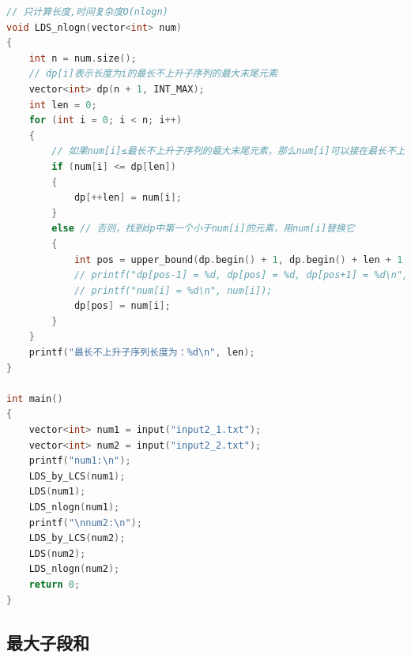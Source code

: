 \documentclass[lang=cn,11pt,a4paper]{elegantpaper}
\begin{document}
\begin{lstlisting}[language=c++]
// 只计算长度,时间复杂度O(nlogn)
void LDS_nlogn(vector<int> num)
{
    int n = num.size();
    // dp[i]表示长度为i的最长不上升子序列的最大末尾元素
    vector<int> dp(n + 1, INT_MAX);
    int len = 0;
    for (int i = 0; i < n; i++)
    {
        // 如果num[i]≤最长不上升子序列的最大末尾元素，那么num[i]可以接在最长不上升子序列后面，形成一个更长的不上升子序列
        if (num[i] <= dp[len]) 
        {
            dp[++len] = num[i];
        }
        else // 否则，找到dp中第一个小于num[i]的元素，用num[i]替换它
        {
            int pos = upper_bound(dp.begin() + 1, dp.begin() + len + 1, num[i], greater<int>()) - dp.begin();
            // printf("dp[pos-1] = %d, dp[pos] = %d, dp[pos+1] = %d\n", dp[pos - 1], dp[pos], dp[pos + 1]);
            // printf("num[i] = %d\n", num[i]);
            dp[pos] = num[i];
        }
    }
    printf("最长不上升子序列长度为：%d\n", len);
}

int main()
{
    vector<int> num1 = input("input2_1.txt");
    vector<int> num2 = input("input2_2.txt");
    printf("num1:\n");
    LDS_by_LCS(num1);
    LDS(num1);
    LDS_nlogn(num1);
    printf("\nnum2:\n");
    LDS_by_LCS(num2);
    LDS(num2);
    LDS_nlogn(num2);
    return 0;
}
\end{lstlisting}

\subsection{最大子段和}
\end{document}
